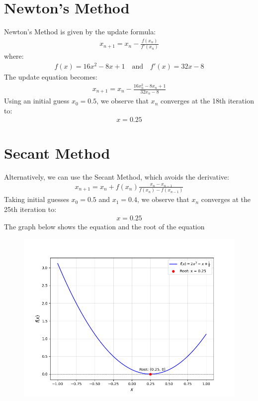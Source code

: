 \documentclass[journal]{IEEEtran}
\begin{document}
\begin{enumerate}
\section*{Newton's Method}
Newton's Method is given by the update formula:
\begin{align}
    x_{n+1} = x_n - \frac{f(x_n)}{f'(x_n)}
\end{align}
where:
\begin{align}
    f(x) = 16x^2 - 8x + 1 \quad \text{and} \quad f'(x) = 32x - 8
\end{align}
The update equation becomes:
\begin{align}
    x_{n+1} = x_n - \frac{16x_n^2 - 8x_n + 1}{32x_n - 8}
\end{align}
Using an initial guess $x_0 = 0.5$, we observe that $x_n$ converges at the 18th iteration to:
\begin{align}
    x = 0.25
\end{align}

\section*{Secant Method}
Alternatively, we can use the Secant Method, which avoids the derivative:
\begin{align}
    x_{n+1} = x_n + f(x_n) \frac{x_n - x_{n-1}}{f(x_n) - f(x_{n-1})}
\end{align}
Taking initial guesses $x_0 = 0.5$ and $x_1 = 0.4$, we observe that $x_n$ converges at the 25th iteration to:
\begin{align}
    x = 0.25
\end{align}
The graph below shows the equation and the root of the equation
\begin{figure}[H]
    \centering
    \includegraphics[width=\columnwidth]{figs/fig.png}
\end{figure}

\end{enumerate}
\end{document}
